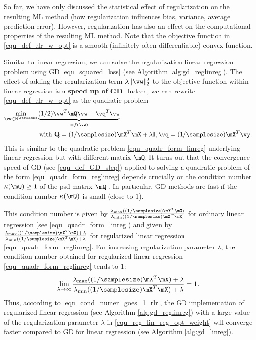 \documentclass[12pt]{report}
\begin{document}
So far, we have only discussed the statistical effect of 
regularization on the resulting ML method (how regularization 
influences bias, variance, average prediction error). However, 
regularization has also an effect on the computational properties 
of the resulting ML method. Note that the objective function 
in \eqref{equ_def_rlr_w_opt} is a smooth (infinitely often differentiable) 
convex function. 

Similar to linear regression, we can solve the regularization 
linear regression problem using GD \eqref{equ_squared_loss} 
(see Algorithm \ref{alg:gd_reglinreg}). The effect of adding the 
regularization term $\lambda \| \vw \|^{2}_{2}$ to the objective 
function within linear regression is a {\bf speed up of GD}. Indeed, 
we can rewrite \eqref{equ_def_rlr_w_opt} as the quadratic problem 
\begin{align} 
\label{equ_quadr_form_reglinreg}
\min_{\vw \in \mathbb{R}^{\featuredim}} & \underbrace{(1/2) \vw^{T} \mQ \vw - \vq^{T}  \vw}_{= f(\vw)} \nonumber \\ 
 & \mbox{ with } \mathbf{Q}= (1/\samplesize) \mX^{T} \mX + \lambda \mathbf{I}, \vq =(1/\samplesize) \mX^{T} \vy. %
\end{align} 
This is similar to the quadratic problem \eqref{equ_quadr_form_linreg} 
underlying linear regression but with different matrix $\mQ$. It turns out 
that the convergence speed of GD (see \eqref{equ_def_GD_step}) applied 
to solving a quadratic problem of the form \eqref{equ_quadr_form_reglinreg} 
depends crucially on the condition number $\kappa(\mQ) \geq 1$ of the 
psd matrix $\mQ$ \cite{JungFixedPoint}. In particular, GD methods are fast 
if the condition number $\kappa(\mQ)$ is small (close to $1$). 

This condition number is given by $\frac{\lambda_{\rm max}((1/\samplesize) \mX^{T} \mX)} {\lambda_{\rm min}((1/\samplesize) \mX^{T} \mX)}$ for ordinary linear regression 
(see \eqref{equ_quadr_form_linreg}) and given by $\frac{\lambda_{\rm max}((1/\samplesize)\mX^{T} \mX) + \lambda} {\lambda_{\rm min}((1/\samplesize)\mX^{T} \mX)+ \lambda}$ 
for regularized linear regression \eqref{equ_quadr_form_reglinreg}. For increasing 
regularization parameter $\lambda$, the condition number obtained for regularized 
linear regression \eqref{equ_quadr_form_reglinreg} tends to $1$: 
\begin{equation}
\label{equ_cond_numer_goes_1_rlr}
\lim_{\lambda \rightarrow \infty} \frac{\lambda_{\rm max}((1/\samplesize)\mX^{T} \mX) + \lambda} {\lambda_{\rm min}((1/\samplesize)\mX^{T} \mX)+ \lambda} =1. 
\end{equation} 
Thus, according to \eqref{equ_cond_numer_goes_1_rlr}, the GD 
implementation of regularized linear regression (see Algorithm \ref{alg:gd_reglinreg}) 
with a large value of the regularization parameter $\lambda$ 
in \eqref{equ_reg_lin_reg_opt_weight} will converge faster compared 
to GD for linear regression (see Algorithm \ref{alg:gd_linreg}). 
\end{document}
